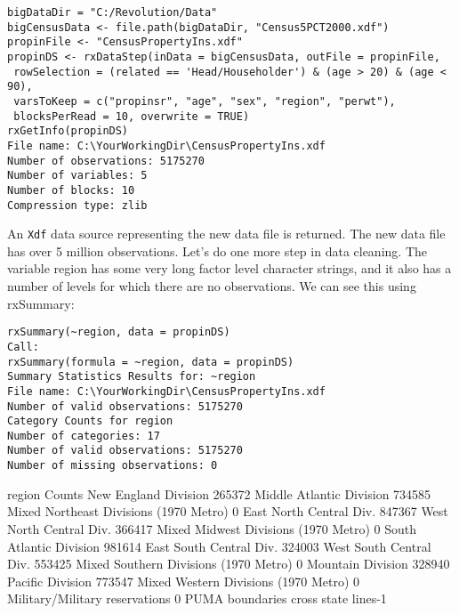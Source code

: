 \begin{framed}
\begin{verbatim}
bigDataDir = "C:/Revolution/Data"
bigCensusData <- file.path(bigDataDir, "Census5PCT2000.xdf")
propinFile <- "CensusPropertyIns.xdf"
propinDS <- rxDataStep(inData = bigCensusData, outFile = propinFile,
 rowSelection = (related == 'Head/Householder') & (age > 20) & (age < 90),
 varsToKeep = c("propinsr", "age", "sex", "region", "perwt"),
 blocksPerRead = 10, overwrite = TRUE)
rxGetInfo(propinDS)
File name: C:\YourWorkingDir\CensusPropertyIns.xdf
Number of observations: 5175270
Number of variables: 5
Number of blocks: 10
Compression type: zlib
\end{verbatim}
\end{framed}
An \texttt{Xdf} data source representing the new data file is returned. The new data file has over 5
million observations.
Let’s do one more step in data cleaning. The variable region has some very long factor level
character strings, and it also has a number of levels for which there are no observations. We
can see this using rxSummary:
\begin{framed}
\begin{verbatim}
rxSummary(~region, data = propinDS)
Call:
rxSummary(formula = ~region, data = propinDS)
Summary Statistics Results for: ~region
File name: C:\YourWorkingDir\CensusPropertyIns.xdf
Number of valid observations: 5175270
Category Counts for region
Number of categories: 17
Number of valid observations: 5175270
Number of missing observations: 0
\end{verbatim}
\end{framed}
region Counts
New England Division 265372
Middle Atlantic Division 734585
Mixed Northeast Divisions (1970 Metro) 0
East North Central Div. 847367
West North Central Div. 366417
Mixed Midwest Divisions (1970 Metro) 0
South Atlantic Division 981614
East South Central Div. 324003
West South Central Div. 553425
Mixed Southern Divisions (1970 Metro) 0
Mountain Division 328940
Pacific Division 773547
Mixed Western Divisions (1970 Metro) 0
Military/Military reservations 0
PUMA boundaries cross state lines-1%



